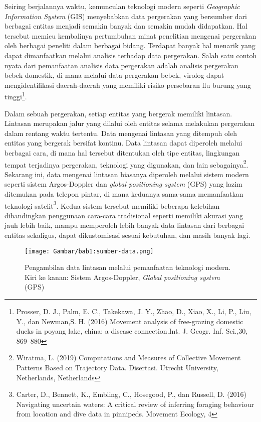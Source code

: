 \documentclass[a4paper,twoside]{article}
\begin{document}
Seiring berjalannya waktu, kemunculan teknologi modern seperti \textit{Geographic Information System} (GIS) menyebabkan data pergerakan yang bersumber dari berbagai entitas menjadi semakin banyak dan semakin mudah didapatkan. Hal tersebut memicu kembalinya pertumbuhan minat penelitian mengenai pergerakan oleh berbagai peneliti dalam berbagai bidang. Terdapat banyak hal menarik yang dapat dimanfaatkan melalui analisis terhadap data pergerakan. Salah satu contoh nyata dari pemanfaatan analisis data pergerakan adalah analisis pergerakan bebek domestik, di mana melalui data pergerakan bebek, virolog dapat mengidentifikasi daerah-daerah yang memiliki risiko persebaran flu burung yang tinggi\footnote{Prosser, D. J., Palm, E. C., Takekawa, J. Y., Zhao, D., Xiao, X., Li, P., Liu, Y., dan Newman,S. H. (2016) Movement analysis of free-grazing domestic ducks in poyang lake, china: a disease connection.Int. J. Geogr. Inf. Sci.,30, 869–880}.

Dalam sebuah pergerakan, setiap entitas yang bergerak memiliki lintasan. Lintasan merupakan jalur yang dilalui oleh entitas selama melakukan pergerakan dalam rentang waktu tertentu. Data mengenai lintasan yang ditempuh oleh entitas yang bergerak bersifat kontinu. Data lintasan dapat diperoleh melalui berbagai cara, di mana hal tersebut ditentukan oleh tipe entitas, lingkungan tempat terjadinya pergerakan, teknologi yang digunakan, dan lain sebagainya\footnote{Wiratma, L. (2019) Computations and Measures of Collective Movement Patterns Based on Trajectory Data. Disertasi. Utrecht University, Netherlands, Netherlands}. Sekarang ini, data mengenai lintasan biasanya diperoleh melalui sistem modern seperti sistem Argos-Doppler dan \textit{global positioning system} (GPS) yang lazim ditemukan pada telepon pintar, di mana keduanya sama-sama memanfaatkan teknologi satelit\footnote{Carter, D., Bennett, K., Embling, C., Hosegood, P., dan Russell, D. (2016) Navigating uncertain waters: A critical review of inferring foraging behaviour from location and dive data in pinnipeds. Movement Ecology, 4}. Kedua sistem tersebut memiliki beberapa kelebihan dibandingkan penggunaan cara-cara tradisional seperti memiliki akurasi yang jauh lebih baik, mampu memperoleh lebih banyak data lintasan dari berbagai entitas sekaligus, dapat dikustomisasi sesuai kebutuhan, dan masih banyak lagi.

\iffalse

\begin{figure}[h]
    \centering
    \texttt{[image: Gambar/bab1:sumber-data.png]}
    \caption[Teknologi pengambilan data lintasan]{Pengambilan data lintasan melalui pemanfaatan teknologi modern. Kiri ke kanan: Sistem Argos-Doppler, \textit{Global positioning system} (GPS)}
    \label{bab1:sumber-data}
\end{figure}
\end{document}
